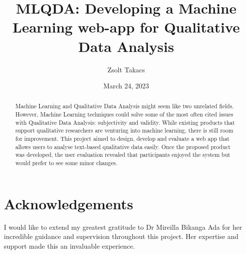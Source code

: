 \documentclass{l4proj}
\begin{document}
\title{MLQDA: Developing a Machine Learning web-app for Qualitative Data Analysis}
\author{Zsolt Takacs}
\date{March 24, 2023}

\maketitle

\begin{abstract}
    Machine Learning and Qualitative Data Analysis might seem like two unrelated fields. However, Machine Learning techniques could solve some of the most often cited issues with Qualitative Data Analysis: subjectivity and validity. While existing products that support qualitative researchers are venturing into machine learning, there is still room for improvement. This project aimed to design, develop and evaluate a web app that allows users to analyse text-based qualitative data easily. Once the proposed product was developed, the user evaluation revealed that participants enjoyed the system but would prefer to see some minor changes. 
\end{abstract}


%
%
\def\consentname {Zsolt Takacs} %
\def\consentdate {24 March 2023} %
%
\educationalconsent


\chapter*{Acknowledgements}
I would like to extend my greatest gratitude to Dr Mireilla Bikanga Ada for her incredible guidance and supervision throughout this project. Her expertise and support made this an invaluable experience.
\end{document}
